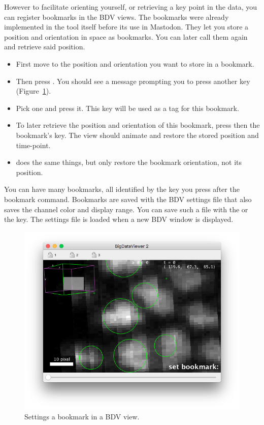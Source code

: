 However to facilitate orienting yourself, or retrieving a key point in the data, you can register bookmarks in the BDV views. 
The bookmarks were already implemented in the \bdv tool itself before its use in Mastodon.
They let you store a position and orientation in space as bookmarks. 
You can later call them again and retrieve said position. 
\begin{itemize}
    \item First move to the position and orientation you want to store in a bookmark.
    \item Then press . You should see a message prompting you to press another key (Figure~\ref{fig:BDVSettingBookmark}).
    \item Pick one and press it. This key will be used as a tag for this bookmark.
    \item To later retrieve the position and orientation of this bookmark, press  then the bookmark's key. The view should animate and restore the stored position and time-point.
    \item {} does the same things, but only restore the bookmark orientation, not its position.
\end{itemize}

You can have many bookmarks, all identified by the key you press after the bookmark command.
Bookmarks are saved with the BDV settings file that also saves the channel color and display range.
You can save such a file with the  or the  key.
The settings file is loaded when a new BDV window is displayed.

\begin{figure}
    \centering
    \includegraphics[height=0.27\textheight]{figures/Mastodon_SettingBookmark.png}
    
    \caption{Settings a bookmark in a BDV view.  }
    \label{fig:BDVSettingBookmark}
\end{figure}


